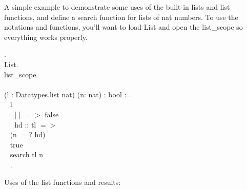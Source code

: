 
A simple example to demonstrate some uses of the built-in lists and list functions, and define a search function for lists of nat numbers. To use the notations and functions, you'll want to load List and open the list\_scope so everything works properly.

\begin{code}
	 .				\\
	 List. 							\\
	 list\_scope.					\\
	\\
	\Fixpoint {} (l : Datatypes.list nat) (n: nat) : bool :=  	\\ \-\ \quad
	  \match l \with 								\\ \-\ \qquad
	   $\mid$ [ ] $=>$ false						\\ \-\ \qquad
	   $\mid$ hd :: tl $=>$ 						\\ \-\ \qquad\qquad
	      \If (n $=?$ hd)							\\ \-\ \qquad\qquad
	      \Then true								\\ \-\ \qquad\qquad
	      \Else search tl n							\\ \-\ \quad
	  \End.									
\end{code}

\noindent
Uses of the list functions and results:
	  
